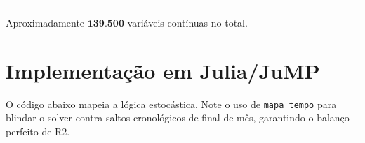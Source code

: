 \documentclass[12pt, a4paper]{article}
\begin{document}
\vspace{8pt}
{\color{accentgray}\rule{\linewidth}{0.5pt}}
\begin{center}
  \small\color{darkgray}
  Aproximadamente $\mathbf{139{.}500}$ vari\'{a}veis cont\'{i}nuas no total.
\end{center}

\newpage
\section{Implementa\c{c}\~{a}o em Julia/JuMP}

O c\'{o}digo abaixo mapeia a l\'{o}gica estoc\'{a}stica. Note o uso de \texttt{mapa\_tempo} para blindar o solver contra saltos cronol\'{o}gicos de final de m\^{e}s, garantindo o balan\c{c}o perfeito de R2.
\end{document}
